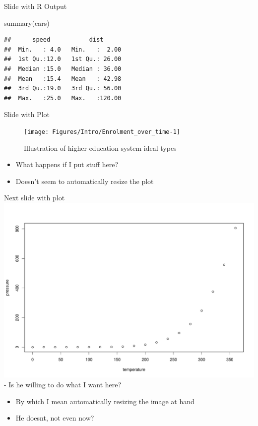 \documentclass[
  ignorenonframetext,
]{beamer}
\newenvironment{Shaded}{\begin{snugshade}}{\end{snugshade}}
\newcommand{\FunctionTok}[1]{\textcolor[rgb]{0.00,0.00,0.00}{#1}}
\newcommand{\NormalTok}[1]{#1}
\begin{document}
\begin{frame}[fragile]{Slide with R Output}
\protect\hypertarget{slide-with-r-output}{}
\begin{Shaded}
\begin{Highlighting}[]
\FunctionTok{summary}\NormalTok{(cars)}
\end{Highlighting}
\end{Shaded}

\begin{verbatim}
##      speed           dist       
##  Min.   : 4.0   Min.   :  2.00  
##  1st Qu.:12.0   1st Qu.: 26.00  
##  Median :15.0   Median : 36.00  
##  Mean   :15.4   Mean   : 42.98  
##  3rd Qu.:19.0   3rd Qu.: 56.00  
##  Max.   :25.0   Max.   :120.00
\end{verbatim}
\end{frame}

\begin{frame}{Slide with Plot}
\protect\hypertarget{slide-with-plot}{}
\begin{figure}
\texttt{[image: Figures/Intro/Enrolment\_over\_time-1]} \caption{Illustration of higher education system ideal types}\label{fig:unnamed-chunk-10}
\end{figure}

\begin{itemize}
\item
  What happens if I put stuff here?
\item
  Doesn't seem to automatically resize the plot
\end{itemize}
\end{frame}

\begin{frame}{Next slide with plot}
\protect\hypertarget{next-slide-with-plot}{}
\includegraphics{Presentation_files/figure-beamer/unnamed-chunk-11-1.pdf}
- Is he willing to do what I want here?

\begin{itemize}
\item
  By which I mean automatically resizing the image at hand
\item
  He doesnt, not even now?
\end{itemize}
\end{frame}
\end{document}
